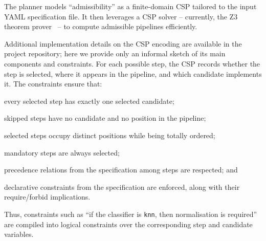 \documentclass[runningheads]{llncs}
\begin{document}
The planner models ``admissibility'' as a finite-domain \ac{CSP}
tailored to the input YAML specification file.
%
It then leverages a \ac{CSP} solver
-- currently, the Z3 theorem prover~\cite{DBLP:conf/tacas/MouraB08} --
to compute admissible pipelines efficiently.

Additional implementation details on the \ac{CSP} encoding are available in the project repository;
here we provide only an informal sketch of its main components and constraints.
%
For each possible step,
the \ac{CSP} records whether the step is selected,
where it appears in the pipeline,
and which candidate implements it.
%
The constraints ensure that:
%
\begin{inlinelist}
  \item every selected step has exactly one selected candidate;
  \item skipped steps have no candidate and no position in the pipeline;
  \item selected steps occupy distinct positions while being totally ordered;
  \item mandatory steps are always selected;
  \item precedence relations from the specification among steps are respected;
  and
  \item declarative constraints from the specification are enforced,
  along with their require/forbid implications.
\end{inlinelist}
%
Thus,
constraints such as
``if the classifier is \texttt{knn}, then normalisation is required''
are compiled into logical constraints over the corresponding step and candidate variables.

\end{document}
